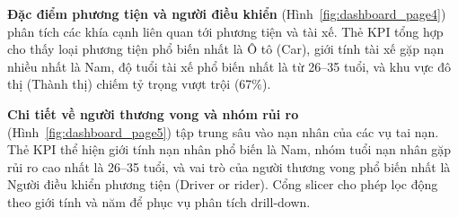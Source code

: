 \textbf{Đặc điểm phương tiện và người điều khiển} (Hình~\ref{fig:dashboard_page4}) phân tích các khía cạnh liên quan tới phương tiện và tài xế. Thẻ KPI tổng hợp cho thấy loại phương tiện phổ biến nhất là Ô tô (Car), giới tính tài xế gặp nạn nhiều nhất là Nam, độ tuổi tài xế phổ biến nhất là từ 26--35 tuổi, và khu vực đô thị (Thành thị) chiếm tỷ trọng vượt trội (67\%).

\textbf{Chi tiết về người thương vong và nhóm rủi ro} (Hình~\ref{fig:dashboard_page5}) tập trung sâu vào nạn nhân của các vụ tai nạn. Thẻ KPI thể hiện giới tính nạn nhân phổ biến là Nam, nhóm tuổi nạn nhân gặp rủi ro cao nhất là 26--35 tuổi, và vai trò của người thương vong phổ biến nhất là Người điều khiển phương tiện (Driver or rider). Cổng slicer cho phép lọc động theo giới tính và năm để phục vụ phân tích drill-down.

